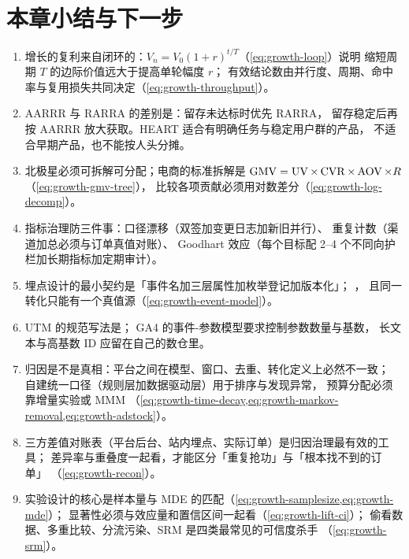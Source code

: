 \section{本章小结与下一步}

\begin{keypoint}[本章要点回顾]
\begin{enumerate}
  \item 增长的复利来自闭环的：$V_n = V_0(1+r)^{t/T}$（\cref{eq:growth-loop}）说明
        缩短周期 $T$ 的边际价值远大于提高单轮幅度 $r$；
        有效结论数由并行度、周期、命中率与复用损失共同决定（\cref{eq:growth-throughput}）。
  \item AARRR 与 RARRA 的差别是：留存未达标时优先 RARRA，
        留存稳定后再按 AARRR 放大获取。HEART 适合有明确任务与稳定用户群的产品，
        不适合早期产品，也不能按人头分摊。
  \item 北极星必须可拆解可分配；电商的标准拆解是
        $\operatorname{GMV} = \operatorname{UV} \times \operatorname{CVR} \times \operatorname{AOV} \times R$（\cref{eq:growth-gmv-tree}），
        比较各项贡献必须用对数差分（\cref{eq:growth-log-decomp}）。
  \item 指标治理防三件事：口径漂移（双签加变更日志加新旧并行）、
        重复计数（渠道加总必须与订单真值对账）、
        Goodhart 效应（每个目标配 2--4 个不同向护栏加长期指标加定期审计）。
  \item 埋点设计的最小契约是「事件名加三层属性加枚举登记加版本化」；
        ，
        且同一转化只能有一个真值源（\cref{eq:growth-event-model}）。
  \item UTM 的规范写法是；
        GA4 的事件-参数模型要求控制参数数量与基数，
        长文本与高基数 ID 应留在自己的数仓里。
  \item 归因是不是真相：平台之间在模型、窗口、去重、转化定义上必然不一致；
        自建统一口径（规则层加数据驱动层）用于排序与发现异常，
        预算分配必须靠增量实验或 MMM
        （\cref{eq:growth-time-decay,eq:growth-markov-removal,eq:growth-adstock}）。
  \item 三方差值对账表（平台后台、站内埋点、实际订单）是归因治理最有效的工具；
        差异率与重叠度一起看，才能区分「重复抢功」与「根本找不到的订单」
        （\cref{eq:growth-recon}）。
  \item 实验设计的核心是样本量与 MDE 的匹配（\cref{eq:growth-samplesize,eq:growth-mde}）；
        显著性必须与效应量和置信区间一起看（\cref{eq:growth-lift-ci}）；
        偷看数据、多重比较、分流污染、SRM 是四类最常见的可信度杀手
        （\cref{eq:growth-srm}）。

\end{enumerate}
\end{keypoint}
